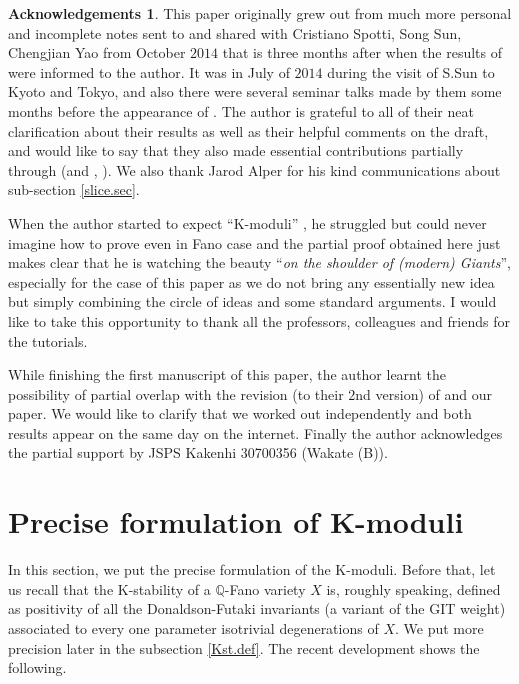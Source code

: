 \documentclass[12pt]{amsart}
\theoremstyle{remark}
\theoremstyle{definition}
\newtheorem*{ack}{Acknowledgements}
\begin{document}
\begin{ack}
This paper originally 
grew out from much more personal and incomplete notes sent to and shared with 
Cristiano Spotti, Song Sun, Chengjian Yao from October $2014$ that is 
three months after when the results of \cite{SSY} 
were informed to the author. 
It was in July of $2014$ during the visit of S.Sun to Kyoto and Tokyo, 
and also there were several seminar 
talks made by them some months before the appearance of \cite{SSY}. 
The author is grateful to all of their neat clarification 
about their results as well as their helpful comments on the draft, 
and would like to say that they also 
made essential contributions 
partially through \cite{SSY} (and \cite{OSS}, \cite{DS}). 
We also thank Jarod Alper for his kind communications 
about sub-section \ref{slice.sec}. 

When the author started to expect ``K-moduli'' \cite[section 5]{Od0}, 
he struggled but could never imagine how to prove even in Fano case and 
the partial proof obtained here just makes clear that he is watching the beauty 
``\textit{on the shoulder of (modern) Giants}'', 
especially for the case of this paper as we do not bring any essentially new idea 
but simply combining the circle of ideas and some standard arguments. 
I would like to take this 
opportunity to thank all the professors, colleagues and friends for the tutorials. 

While finishing the first manuscript of this paper, the author learnt the possibility of 
partial overlap with the revision (to their $2$nd version) 
of \cite{LWX} and our paper. We would like to clarify 
that we worked out independently and both results 
appear on the same day on the internet. 
Finally the author acknowledges the partial support by JSPS Kakenhi 30700356 (Wakate (B)). 
\end{ack}

\section{Precise formulation of K-moduli}\label{precise.Kmod}

In this section, we put the precise formulation of the K-moduli. 
Before that, 
let us recall that the K-stability of a $\mathbb{Q}$-Fano variety $X$ is, roughly speaking, 
defined as positivity of all the Donaldson-Futaki invariants (a variant of the GIT weight) 
associated to every 
one parameter isotrivial degenerations of $X$. We put more precision later in the 
subsection \ref{Kst.def}. The recent development shows the following. 
\end{document}
